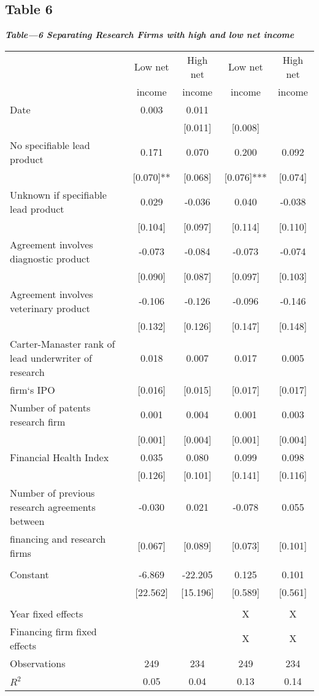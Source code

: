 \subsection{Table 6}
\textbf{\textit{Table---6 Separating Research Firms with high and low net income}} \\
\begin{tabular}{lcccc}
 \hline \hline
&Low net &High net & Low net & High net \\
&income&income&income&income
\\ \hline
Date &0.003 &0.011\\
&&[0.011] &[0.008]\\
No specifiable lead product&0.171 &0.070 &0.200 &0.092\\
&[0.070]**& [0.068] &[0.076]***& [0.074]\\
Unknown if specifiable lead product&0.029 &-0.036 &0.040 &-0.038\\
&[0.104]& [0.097] &[0.114]& [0.110]\\
Agreement involves diagnostic product&-0.073 &-0.084 &-0.073 &-0.074\\
&[0.090]& [0.087]& [0.097] &[0.103]\\
Agreement involves veterinary product &-0.106 &-0.126 &-0.096 &-0.146\\
&[0.132]& [0.126] &[0.147] &[0.148]\\
Carter-Manaster rank of lead underwriter of research &0.018& 0.007 &0.017 &0.005\\
\quad firm`s IPO &[0.016]& [0.015]&[0.017] &[0.017]\\
Number of patents research firm &0.001 &0.004 &0.001 &0.003 \\ 
&[0.001]& [0.004]& [0.001]& [0.004]\\
Financial Health Index&0.035& 0.080 &0.099 &0.098\\
&[0.126]& [0.101]& [0.141] &[0.116]\\
Number of previous research agreements between&-0.030& 0.021 &-0.078 &0.055 \\
\quad financing and research firms&[0.067] &[0.089] &[0.073] &[0.101]\\
\\
Constant &-6.869 &-22.205 &0.125& 0.101\\
&[22.562] &[15.196] &[0.589]& [0.561]\\
\\
Year fixed effects&&&X&X\\
Financing firm fixed effects&&&X&X\\
Observations& 249 &234 &249 &234\\
$R^2$&0.05 &0.04 &0.13 &0.14\\



\hline

\end{tabular}
